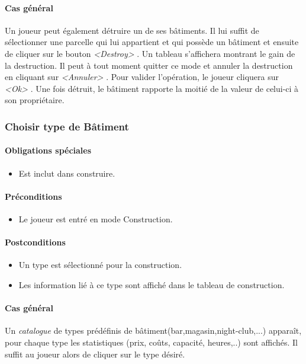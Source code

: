 \documentclass[a4paper,11pt]{report}
\begin{document}
\paragraph{Cas général}
Un joueur peut également détruire un de ses bâtiments. Il lui suffit de sélectionner une parcelle qui lui appartient et qui possède un bâtiment et ensuite de cliquer sur le bouton \og \textit{<Destroy>} \fg. Un tableau s'affichera montrant le gain de la destruction. Il peut à tout moment quitter ce mode et annuler la destruction en cliquant sur \og \textit{<Annuler>} \fg. Pour valider l'opération, le joueur cliquera sur \og \textit{<Ok>} \fg. Une fois détruit, le bâtiment rapporte la moitié de la valeur de celui-ci à son propriétaire.
\newpage
\subsubsection{Choisir type de Bâtiment}
\paragraph{Obligations spéciales}
\begin{itemize}
 \item Est inclut dans construire.
\end{itemize}
\paragraph{Préconditions}
\begin{itemize}
 \item Le joueur est entré en mode Construction.
\end{itemize}
\paragraph{Postconditions}
\begin{itemize}
 \item Un type est sélectionné pour la construction.
 \item Les information lié à ce type sont affiché dans le tableau de construction.
\end{itemize}
\paragraph{Cas général}
Un \textit{catalogue} de types prédéfinis de bâtiment(bar,magasin,night-club,...) apparaît, pour chaque type les statistiques (prix, coûts, capacité, heures,..) sont affichés. Il suffit au joueur alors de cliquer sur le type désiré.
\end{document}
